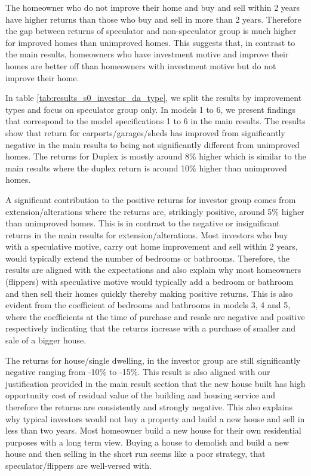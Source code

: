 \documentclass[AEJ,reqno, draftmode]{AEA} %
\begin{document}
The homeowner who do not improve their home and buy and sell within 2 years have higher returns than those who buy and sell in more than 2 years. Therefore the gap between returns of speculator and non-speculator group is much higher for improved homes than unimproved homes. This suggests that, in contrast to the main results, homeowners who have investment motive and improve their homes are better off than homeowners with investment motive but do not improve their home.

In table \ref{tab:results_s0_investor_da_type}, we split the results by improvement types and focus on speculator group only. In models 1 to 6, we present findings that correspond to the model specifications 1 to 6 in the main results. The results show that return for carports/garages/sheds has improved from significantly negative in the main results to being not significantly different from unimproved homes. The returns for Duplex is mostly around 8\% higher which is similar to the main results where the duplex return is around 10\% higher than unimproved homes. 


\restoregeometry

A significant contribution to the positive returns for investor group comes from extension/alterations where the returns are, strikingly positive, around 5\% higher than unimproved homes. This is in contrast to the negative or insignificant returns in the main results for extension/alterations. Most investors who buy with a speculative motive, carry out home improvement and sell within 2 years, would typically extend the number of bedrooms or bathrooms. Therefore, the results are aligned with the expectations and also explain why most homeowners (flippers) with speculative motive would typically add a bedroom or bathroom and then sell their homes quickly thereby making positive returns. This is also evident from the coefficient of bedrooms and bathrooms in models 3, 4 and 5, where the coefficients at the time of purchase and resale are negative and positive respectively indicating that the returns increase with a purchase of smaller and sale of a bigger house.

The returns for house/single dwelling, in the investor group are still significantly negative ranging from -10\% to -15\%. This result is also aligned with our justification provided in the main result section that the new house built has high opportunity cost of residual value of the building and housing service and therefore the returns are consistently and strongly negative. This also explains why typical investors would not buy a property and build a new house and sell in less than two years. Most homeowner build a new house for their own residential purposes with a long term view. Buying a house to demolish and build a new house and then selling in the short run seems like a poor strategy, that speculator/flippers are well-versed with.
\end{document}
